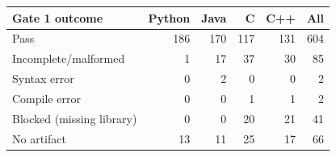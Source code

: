 \begin{tabular}{@{}lrrrrr@{}}
\toprule
Gate 1 outcome & Python & Java & C & C++ & All \\
\midrule
Pass & 186 & 170 & 117 & 131 & 604 \\
Incomplete/malformed & 1 & 17 & 37 & 30 & 85 \\
Syntax error & 0 & 2 & 0 & 0 & 2 \\
Compile error & 0 & 0 & 1 & 1 & 2 \\
Blocked (missing library) & 0 & 0 & 20 & 21 & 41 \\
No artifact & 13 & 11 & 25 & 17 & 66 \\
\bottomrule
\end{tabular}
